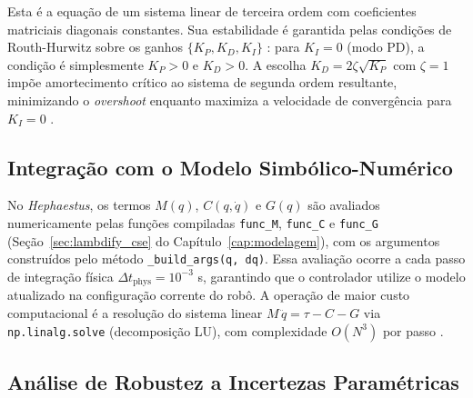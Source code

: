 Esta é a equação de um sistema linear de terceira ordem com coeficientes matriciais diagonais constantes. Sua estabilidade é garantida pelas condições de Routh-Hurwitz sobre os ganhos $\{K_P, K_D, K_I\}$ \cite{astrom1995theory, ogata2010modern}: para $K_I = 0$ (modo PD), a condição é simplesmente $K_P > 0$ e $K_D > 0$. A escolha $K_D = 2\zeta\sqrt{K_P}$ com $\zeta = 1$ impõe amortecimento crítico ao sistema de segunda ordem resultante, minimizando o \textit{overshoot} enquanto maximiza a velocidade de convergência para $K_I = 0$ \cite{astrom1995theory}.

\subsection{Integração com o Modelo Simbólico-Numérico}

No \textit{Hephaestus}, os termos $M(q)$, $C(q,\dot{q})$ e $G(q)$ são avaliados numericamente pelas funções compiladas \texttt{func\_M}, \texttt{func\_C} e \texttt{func\_G} (Seção~\ref{sec:lambdify_cse} do Capítulo~\ref{cap:modelagem}), com os argumentos construídos pelo método \texttt{\_build\_args(q, dq)}. Essa avaliação ocorre a cada passo de integração física $\Delta t_{\text{phys}} = 10^{-3}$ s, garantindo que o controlador utilize o modelo atualizado na configuração corrente do robô. A operação de maior custo computacional é a resolução do sistema linear $M\,\ddot{q} = \tau - C - G$ via \texttt{np.linalg.solve} (decomposição LU), com complexidade $O(N^3)$ por passo \cite{golub2013matrix}.

\subsection{Análise de Robustez a Incertezas Paramétricas}

